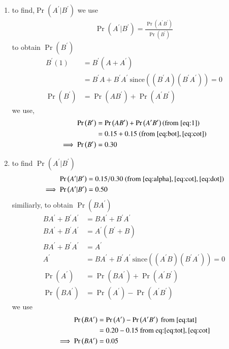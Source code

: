 \documentclass[journal,12pt,twocolumn]{IEEEtran}
\providecommand{\pr}[1]{\ensuremath{\Pr\left(#1\right)}}
\theoremstyle{remark}
\begin{document}
\begin{enumerate}

\item to find,$\pr{A ^\prime|B ^\prime}$ we use
\begin{align}
 \pr{A ^\prime|B ^\prime}=\frac{\pr{ A ^\prime B ^\prime }}{\pr{B^\prime}} \label{eq:dot}
\end{align}
to obtain $\pr{B ^\prime}$ 
\begin{align}
B^ \prime(1)&=B^ \prime(A+A ^\prime)
\\&=B^ \prime A +B^ \prime A ^\prime
\ \text{since} ((B^ \prime A )(B^ \prime A ^\prime))=0
\\\pr{B^ \prime}&=\pr{A B ^\prime} + \pr{A ^\prime B ^\prime}  \label{eq:1}
\end{align}
we use,
\begin{align}
 \pr{B^ \prime}&= \pr{A B ^\prime} + \pr{A ^\prime B ^\prime}  (\text{from }\eqref{eq:1})
\\             &=0.15 +0.15 \ (\text{from } \eqref{eq:bot},\eqref{eq:cot})
\\ \implies \pr{B ^\prime} &=0.30 \label{eq:alpha}
\end{align}
\item to find $\pr{A ^\prime|B ^\prime}$
\begin{align}
 \pr{A^\prime|B ^\prime}&= 0.15/0.30 \  (\text{from }\eqref{eq:alpha},\eqref{eq:cot},\eqref{eq:dot})
\\ \implies \pr{A ^\prime|B ^\prime} &= 0.50
\end{align}
similiarly, to obtain $\pr{B A ^\prime}$ 
\begin{align}
B A ^\prime +B ^\prime A ^\prime &=B A ^\prime +B ^\prime A ^\prime
\\ B A ^\prime +B ^\prime A^\prime&=A ^\prime(B ^\prime +B)
\\ B A ^\prime +B ^\prime A ^\prime&=A^\prime
\\ A^\prime &=  B A ^\prime +B ^\prime A ^\prime
\ \text{since} ((A^ \prime B )(B^ \prime A ^\prime))=0
\\ \pr{A^ \prime}&=\pr{B A ^\prime} + \pr{A ^\prime B ^\prime} 
\\ \pr{B  A ^\prime}&=\pr{A^\prime}-\pr{A ^\prime B ^\prime} \label{eq:tat}
\end{align}
 we use
\begin{align}
 \pr{B  A ^\prime}&=\pr{A^\prime}-\pr{A ^\prime B ^\prime} \   \text{from }\eqref{eq:tat}
\\ &= 0.20-0.15  \ \text{from eq:} \eqref{eq:tot}, \eqref{eq:cot}
\\ \implies \pr{B  A^\prime} &= 0.05
\end{align}
\end{enumerate}
\end{document}
